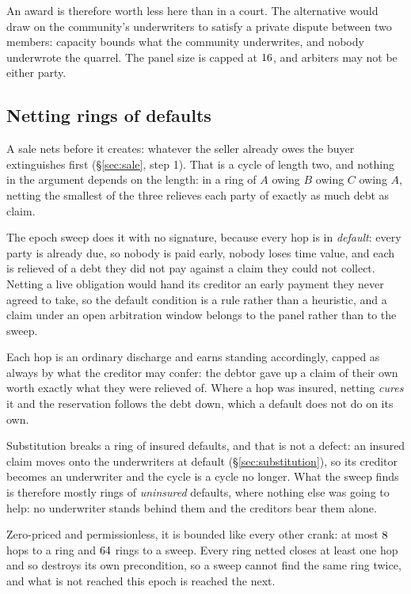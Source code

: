 An award is therefore worth less here than in a court. The alternative would draw on the
community's underwriters to satisfy a private dispute between two members: capacity
bounds what the community underwrites, and nobody underwrote the quarrel. The panel size
is capped at $16$, and arbiters may not be either party.

\subsection{Netting rings of defaults}
\label{sec:netting}

A sale nets before it creates: whatever the seller already owes the buyer extinguishes
first (\S\ref{sec:sale}, step 1). That is a cycle of length two, and nothing in the
argument depends on the length: in a ring of $A$ owing $B$ owing $C$ owing $A$, netting
the smallest of the three relieves each party of exactly as much debt as claim.

The epoch sweep does it with no signature, because every hop is in \emph{default}: every
party is already due, so nobody is paid early, nobody loses time value, and each is
relieved of a debt they did not pay against a claim they could not collect. Netting a live
obligation would hand its creditor an early payment they never agreed to take, so the
default condition is a rule rather than a heuristic, and a claim under an open arbitration
window belongs to the panel rather than to the sweep.

Each hop is an ordinary discharge and earns standing accordingly, capped as always by what
the creditor may confer: the debtor gave up a claim of their own worth exactly what they
were relieved of. Where a hop was insured, netting \emph{cures} it and the reservation
follows the debt down, which a default does not do on its own.

Substitution breaks a ring of insured defaults, and that is not a defect: an insured claim
moves onto the underwriters at default (\S\ref{sec:substitution}), so its creditor becomes
an underwriter and the cycle is a cycle no longer. What the sweep finds is therefore mostly
rings of \emph{uninsured} defaults, where nothing else was going to help: no underwriter
stands behind them and the creditors bear them alone.

Zero-priced and permissionless, it is bounded like every other crank: at most
$8$ hops to a ring and $64$ rings to a
sweep. Every ring netted closes at least one hop and so destroys its own precondition, so a
sweep cannot find the same ring twice, and what is not reached this epoch is reached the
next.

